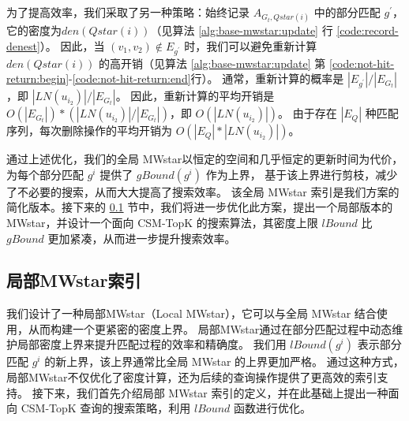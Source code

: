 \begin{algorithm}[H]
    \end{algorithm}
     
     为了提高效率，我们采取了另一种策略：始终记录 $A_{G_t, Qstar(i)}$ 中的部分匹配 $g^\prime$，它的密度为$den(Qstar(i))$（见算法 \ref{alg:base-mwstar:update} 行 \ref{code:record-denest}）。
     因此，当 $(v_1, v_2) \notin E_{g^\prime}$ 时，我们可以避免重新计算 $den(Qstar(i))$ 的高开销（见算法 \ref{alg:base-mwstar:update}  第 \ref{code:not-hit-return:begin}-\ref{code:not-hit-return:end}行）。
     通常，重新计算的概率是 $|E_{g^\prime}|/|E_{G_t}|$，即 $|LN(u_{i_2})|/|E_{G_t}|$。
     因此，重新计算的平均开销是 $O(|E_{G_t}|)*(|LN(u_{i_2})|/|E_{G_t}|)$，即 $O(|LN(u_{i_2})|)$。
     由于存在 $|E_Q|$ 种匹配序列，每次删除操作的平均开销为 $O(|E_Q|*|LN(u_{i_2})|)$。
         
     通过上述优化，我们的全局 MWstar以恒定的空间和几乎恒定的更新时间为代价，为每个部分匹配 $g^i$ 提供了 $gBound(g^i)$ 作为上界，
     基于该上界进行剪枝，减少了不必要的搜索，从而大大提高了搜索效率。
     该全局 MWstar 索引是我们方案的简化版本。接下来的 \ref{mwstar:local} 节中，我们将进一步优化此方案，提出一个局部版本的 MWstar，并设计一个面向 CSM-TopK 的搜索算法，其密度上限 $lBound$ 比 $gBound$ 更加紧凑，从而进一步提升搜索效率。

\subsection{局部MWstar索引}
\label{mwstar:local}
我们设计了一种局部MWstar（Local MWstar），它可以与全局 MWstar 结合使用，从而构建一个更紧密的密度上界。
局部MWstar通过在部分匹配过程中动态维护局部密度上界来提升匹配过程的效率和精确度。
我们用 $lBound(g^i)$ 表示部分匹配 $g^i$ 的新上界，该上界通常比全局 MWstar 的上界更加严格。
通过这种方式，局部MWstar不仅优化了密度计算，还为后续的查询操作提供了更高效的索引支持。
接下来，我们首先介绍局部 MWstar 索引的定义，并在此基础上提出一种面向 CSM-TopK 查询的搜索策略，利用 $lBound$ 函数进行优化。


